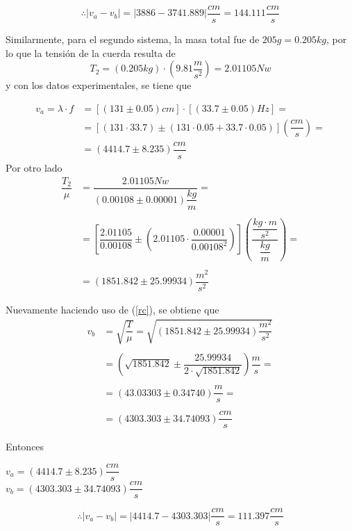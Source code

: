 \documentclass[a4paper, 10pt]{article}
\begin{document}
 	$$\therefore |v_a-v_b|=\left|3886-3741.889\right|\frac{cm}{s}=144.111\frac{cm}{s}$$
 	
 	Similarmente, para el segundo sistema, la masa total fue de $ 205g=0.205kg $, por lo que la tensión de la cuerda resulta de
 	$$T_2=(0.205 kg)\cdot \left(9.81\frac{m}{s^2}\right)=2.01105 Nw$$ 
 	y con los datos experimentales, se tiene que
 	
 	\begin{align*}
 		v_a=\lambda\cdot f&=[(131\pm0.05)cm]\cdot[(33.7\pm 0.05)Hz]=\\
 		&=[(131\cdot33.7)\pm(131\cdot0.05+ 33.7\cdot0.05)]\left(\dfrac{cm}{s}\right)=\\
 		&=(4414.7\pm8.235)\dfrac{cm}{s}
 	\end{align*}
 	Por otro lado
 	\begin{align*}
 		\dfrac{T_2}{\mu}&=\dfrac{2.01105 Nw}{(0.00108\pm 0.00001)\dfrac{kg}{m}}=\\\\
 		&=\left[\dfrac{2.01105}{0.00108}\pm\left(2.01105\cdot\dfrac{0.00001}{0.00108^2}\right)\right]\left(\dfrac{\dfrac{kg\cdot m}{s^2}}{\dfrac{kg}{m}}\right)=\\\\
 		&=(1851.842\pm25.99934)\dfrac{m^2}{s^2}
 	\end{align*}
 	
 	Nuevamente haciendo uso de (\ref{rc}), se obtiene que
 	\begin{align*}
 		v_b&=\sqrt{\dfrac{T}{\mu}}=\sqrt{(1851.842\pm25.99934)\dfrac{m^2}{s^2}}\\\\
 		&=\left(\sqrt{1851.842}\pm\dfrac{25.99934}{2\cdot\sqrt{1851.842}}\right)\dfrac{m}{s}=\\\\
 		&=(43.03303\pm 0.34740)\dfrac{m}{s}=\\\\
 		&=(4303.303\pm 34.74093)\dfrac{cm}{s}
 	\end{align*}
 	
 	Entonces
 	\begin{center}
 		\begin{multicols}{2}
 			$ v_a=(4414.7\pm8.235)\dfrac{cm}{s} $\\
 			$ v_b=(4303.303\pm 34.74093)\dfrac{cm}{s} $
 		\end{multicols}
 	\end{center}
 	
 	$$\therefore |v_a-v_b|=\left|4414.7-4303.303\right|\frac{cm}{s}=111.397\frac{cm}{s}$$
 	
\end{document}
